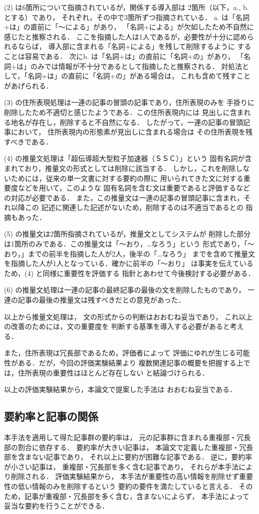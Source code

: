 (2) は6箇所について指摘されているが，関係する導入部は
2箇所（以下，a., b. とする）であり，
それぞれ，その中で3箇所ずつ指摘されている．
a. は「名詞+は」の直前に「〜による」があり，
「名詞+による」が欠如したため不自然に感じたと推察される．
ここを指摘した人は1人であるが，必要性が十分に認められるならば，
導入部に含まれる「名詞+による」を残して削除するように
することは容易である．
次にb. は「名詞+は」の直前に「名詞+の」があり，
「名詞+は」のみでは情報が不十分であるとして指摘したと推察される．
対処法として，「名詞+は」の直前に「名詞+の」がある場合は，
これも含めて残すことがあげられる．

(3) の住所表現処理は一連の記事の冒頭の記事であり，住所表現のみを
手掛りに削除したため不適切と感じたようである．この住所表現内には
見出しに含まれる地名が存在し，削除すると不自然になる．
したがって，一連の記事の冒頭記事において，
住所表現内の形態素が見出しに含まれる場合は
その住所表現を残すべきである．

(4) の推量文処理は「超伝導超大型粒子加速器（ＳＳＣ）」という
固有名詞が含まれており，推量文の形式としては削除に該当する．
しかし，これを削除しないためには，従来の単一文書に対する要約の際に
用いられてきた文に対する重要度などを用いて，このような
固有名詞を含む文は重要であると評価するなどの対応が必要である．
また，この推量文は一連の記事の冒頭記事に含まれ，それ以降この
記述に関連した記述がないため，削除するのは不適当であるとの
指摘もあった．

(5) の推量文は2箇所指摘されているが，推量文としてシステムが
削除した部分は1箇所のみである．この推量文は「〜おり，…なろう」という
形式であり，「〜おり，」までの前半を指摘した人が2人，後半の「…なろう」
までを含めて推量文を指摘した人が1人となっている．確かに前半の「〜おり」
は事実を伝えているため，(4) と同様に重要性を評価する
指針とあわせて今後検討する必要がある．

(6) の推量文処理は一連の記事の最終記事の最後の文を削除したものであり，
一連の記事の最後の推量文は残すべきだとの意見があった．

以上から推量文処理は，
文の形式からの判断はおおむね妥当であり，
これ以上の改善のためには，文の重要度を
判断する基準を導入する必要があると考える．

また，住所表現は冗長部であるため，評価者によって
評価にゆれが生じる可能性がある．だが，今回の評価実験結果より
複数関連記事の概要を把握する上では，住所表現の重要性はほとんど存在しない
と結論づけられる．

以上の評価実験結果から，本論文で提案した手法は
おおむね妥当である．

\subsection{要約率と記事の関係}
本手法を適用して得た記事群の要約率は，
元の記事群に含まれる重複部・冗長部の割合に依存する．
要約率が大きい記事は，
本論文で定義した重複部・冗長部を含まない記事であり，
それ以上に要約が困難な記事である．
逆に，要約率が小さい記事は，
重複部・冗長部を多く含む記事であり，
それらが本手法により削除される．
評価実験結果から，
本手法が重要性の高い情報を削除せず重要性の低い情報のみを削除するという
要約の要件を満たしていると言える．
そのため，記事が重複部・冗長部を多く含む，含まないによらず，
本手法によって妥当な要約を行うことができる．

